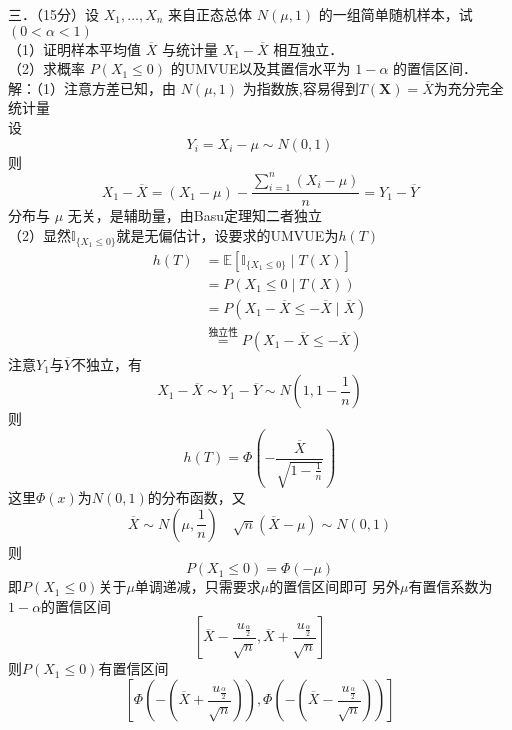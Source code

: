\documentclass[UTF8]{ctexart}
\begin{document}
\noindent 三．（15分）设 $X_1, \ldots, X_n$ 来自正态总体 $N(\mu, 1)$ 的一组简单随机样本，试 $(0<\alpha<1)$\\
（1）证明样本平均值 $\overline{X}$ 与统计量 $X_1-\overline{X}$ 相互独立．\\
（2）求概率 $P\left(X_1 \leq 0\right)$ 的UMVUE以及其置信水平为 $1-\alpha$ 的置信区间．\\
解：（1）注意方差已知，由 $N(\mu,1)$ 为指数族,容易得到$T(\boldsymbol{X})=\overline{X}$为充分完全统计量\\
设 
$$Y_i=X_i-\mu \sim N(0,1)$$
则 $$X_1-\overline{X}=\left(X_1-\mu\right)-\frac{\sum\limits_{i=1}^n \left(X_i-\mu\right)}{n}=Y_1-\overline{Y}$$
分布与 $\mu$ 无关，是辅助量，由Basu定理知二者独立\\
（2）显然$\mathbb{I}_{\{X_1\le 0\}}$就是无偏估计，设要求的UMVUE为$h(T)$
\[
\begin{aligned}
	h(T) & =\mathbb{E}\left[\mathbb{I}_{\{X_1\le 0\}} \mid T(X)\right] \\
	& =P\left(X_1 \leqslant 0 \mid T(X)\right) \\
	&=P\left(X_1-\overline{X} \leqslant -\overline{X} \mid \overline{X}\right) \\
	&\stackrel{\text{独立性}}{=} P\left(X_1-\overline{X} \leqslant-\overline{X}\right) 
\end{aligned}
\]
注意$Y_1$与$\overline{Y}$不独立，有
$$X_1-\overline{X}\sim Y_1-\overline{Y}\sim N\left(1,1-\frac{1}{n} \right) $$
则
\[
h(T)=\Phi\left(-\frac{\overline{X}}{\sqrt{1-\frac{1}{n}}} \right) 
\]
这里$\Phi(x)$为$N(0,1)$的分布函数，又
\[
\overline{X} \sim N\left(\mu, \frac{1}{n}\right) \quad \sqrt{n}(\overline{X}-\mu) \sim N(0,1) 
\]
则
\[
P(X_1\le 0)=\Phi(-\mu)
\]
即$P(X_1\le 0)$关于$\mu$单调递减，只需要求$\mu$的置信区间即可
另外$\mu$有置信系数为$1-\alpha$的置信区间
\[
\left[\overline{X}-\frac{u_{\frac{\alpha}{2}}}{\sqrt{n}},\overline{X}+\frac{u_{\frac{\alpha}{2}}}{\sqrt{n}} \right] 
\]
则$P(X_1\le 0)$有置信区间
\[
\left[\Phi\left(-\left(\overline{X}+\frac{u_{\frac{\alpha}{2}}}{\sqrt{n}}\right)\right), \Phi\left(-\left(\overline{X}-\frac{u_{\frac{\alpha}{2}}}{\sqrt{n}}\right)\right)\right]
\]\\
\end{document}
